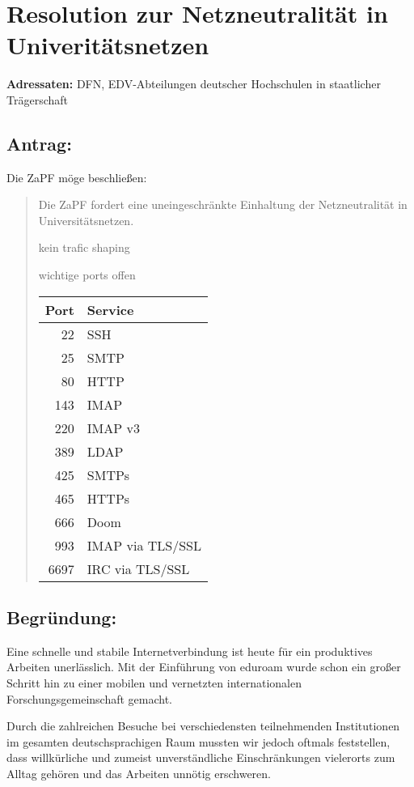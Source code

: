 \documentclass[12pt,oneside]{scrartcl}
\begin{document}
\section*{Resolution zur Netzneutralität in Univeritätsnetzen}

\textbf{Adressaten:} DFN, EDV-Abteilungen deutscher Hochschulen in staatlicher Trägerschaft

\subsection*{Antrag:}
Die ZaPF möge beschließen:
\begin{quote}
Die ZaPF fordert eine uneingeschränkte Einhaltung der Netzneutralität in Universitätsnetzen.

kein trafic shaping

wichtige ports offen

\begin{tabular}{rl}
	\toprule
	Port & Service \\
	\midrule
	22 & SSH \\
	25 & SMTP \\
	80 & HTTP \\
	143 & IMAP \\
	220 & IMAP v3 \\
	389 & LDAP \\
	425 & SMTPs \\
	465 & HTTPs \\
	666 & Doom \\
	993 & IMAP via TLS/SSL \\
	6697 & IRC via TLS/SSL \\
	\bottomrule
\end{tabular}
\end{quote}

\subsection*{Begründung:}

Eine schnelle und stabile Internetverbindung ist heute für ein produktives
Arbeiten unerlässlich. Mit der Einführung von eduroam wurde schon ein großer
Schritt hin zu einer mobilen und vernetzten internationalen
Forschungsgemeinschaft gemacht.

Durch die zahlreichen Besuche bei verschiedensten teilnehmenden Institutionen im
gesamten deutschsprachigen Raum mussten wir jedoch oftmals feststellen, dass
willkürliche und zumeist unverständliche Einschränkungen vielerorts zum Alltag
gehören und das Arbeiten unnötig erschweren.
\end{document}
